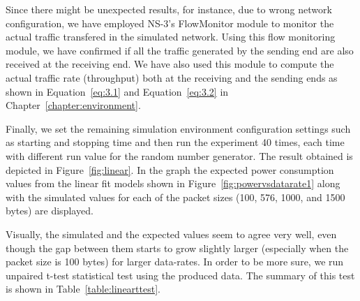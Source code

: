 Since there might be unexpected results, for instance, due to wrong network configuration, we have employed NS-3's FlowMonitor module to monitor the actual traffic transfered in the simulated network. Using this flow monitoring module, we have confirmed if all the traffic generated by the sending end are also received at the receiving end. We have also used this module to compute the actual traffic rate (throughput) both at the receiving and the sending ends as shown in Equation~\ref{eq:3.1} and Equation~\ref{eq:3.2} in Chapter~\ref{chapter:environment}.

Finally, we set the remaining simulation environment configuration settings such as starting and stopping time and then run the experiment 40 times, each time with different run value for the random number generator. The result obtained is depicted in Figure~\ref{fig:linear}. In the graph the expected power consumption values from the linear fit models shown in Figure~\ref{fig:powervsdatarate1} along with the simulated values for each of the packet sizes (100, 576, 1000, and 1500 bytes) are displayed.

Visually, the simulated and the expected values seem to agree very well, even though the gap between them starts to grow slightly larger (especially when the packet size is 100 bytes) for larger data-rates. In order to be more sure, we run unpaired t-test statistical test using the produced data. The summary of this test is shown in Table~\ref{table:linearttest}. 

